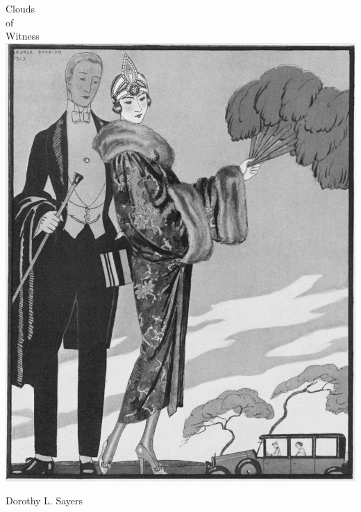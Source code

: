 \documentclass[
paper=5.5in:8.5in,
BCOR=7mm,
twoside,
DIV=calc,
11pt,
usegeometry,
chapterprefix,
headings=big]{scrbook} %
\newcommand{\moderatelyhuge}{\fontsize{40}{50}\selectfont}
\newcommand{\reasonablyhuge}{\fontsize{30}{40}\selectfont}
\def\coverimagesize{0.7\linewidth}
\newcommand{\HUGE}{\fontsize{50}{60}\selectfont}
\def\coverimagesize{0.8\linewidth}
\newcommand{\HUGE}{\fontsize{60}{70}\selectfont}
\begin{document}
\setlength{\epigraphwidth}{0.8\textwidth}
\renewcommand{\epigraphflush}{center}
\renewcommand{\sourceflush}{center}


\frontmatter
\pagestyle{empty}
\begin{titlepage}
   \recalctypearea

  \begin{center}\mytitlefont
{\HUGE Clouds}\\
\vspace{0.5cm}
{\moderatelyhuge of}\\
\vspace{0.2cm}
{\HUGE Witness}\\
\vspace*{.5cm}
\includegraphics[width=\coverimagesize]{casino}\\
 \end{center}
 \vspace*{.1cm}
 \begin{center}\myauthorfont
{\reasonablyhuge Dorothy L. Sayers}\\
\end{center}
  \end{titlepage}
\end{document}
